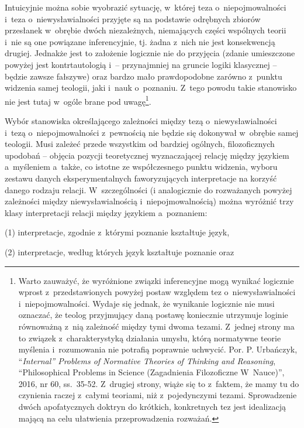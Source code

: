 \begin{enumerate}[label = \arabic*), listparindent=1.5em]
Intuicyjnie można sobie wyobrazić sytuację, w~której teza o~niepojmowalności i~teza o~niewysławialności przyjęte są na podstawie odrębnych zbiorów przesłanek w~obrębie dwóch niezależnych, niemających części wspólnych teorii i~nie są one powiązane inferencyjnie, tj. żadna z~nich nie jest konsekwencją drugiej. Jednakże jest to założenie logicznie nie do przyjęcia (zdanie umieszczone powyżej jest kontrtautologią i~-- przynajmniej na gruncie logiki klasycznej -- będzie zawsze fałszywe) oraz bardzo mało prawdopodobne zarówno z~punktu widzenia samej teologii, jaki i~nauk o~poznaniu. Z~tego powodu takie stanowisko nie jest tutaj w~ogóle brane pod uwagę\footnote{Warto zauważyć, że wyróżnione związki inferencyjne mogą wynikać logicznie wprost z~przedstawionych powyżej postaw względem tez o~niewysławialności i~niepojmowalności. Wydaje się jednak, że wynikanie logicznie nie musi oznaczać, że teolog przyjmujący daną postawę koniecznie utrzymuje loginie równoważną z~nią zależność między tymi dwoma tezami. Z~jednej strony ma to związek z~charakterystyką działania umysłu, którą normatywne teorie myślenia i~rozumowania nie potrafią poprawnie uchwycić. Por. P. Urbańczyk, ``\textit{Internal'' Problems of Normative Theories of Thinking and Reasoning}, ``Philosophical Problems in Science (Zagadnienia Filozoficzne W~Nauce)'', 2016, nr 60, ss.~35-52. Z~drugiej strony, wiąże się to z~faktem, że mamy tu do czynienia raczej z~całymi teoriami, niż z~pojedynczymi tezami. Sprowadzenie dwóch apofatycznych doktryn do krótkich, konkretnych tez jest idealizacją mającą na celu ułatwienia przeprowadzenia rozważań.}.
\end{enumerate}

Wybór stanowiska określającego zależności między tezą o~niewysławialności i~tezą o~niepojmowalności z~pewnością nie będzie się dokonywał w~obrębie samej teologii. Musi zależeć przede wszystkim od bardziej ogólnych, filozoficznych upodobań -- objęcia pozycji teoretycznej wyznaczającej relację między językiem a~myśleniem a~także, co istotne ze współczesnego punktu widzenia, wyboru zestawu danych eksperymentalnych faworyzujących interpretacje na korzyść danego rodzaju relacji. W~szczególności (i analogicznie do rozważanych powyżej zależności między niewysławialnością i~niepojmowalnością) można wyróżnić trzy klasy interpretacji relacji między językiem a~poznaniem:

(1) interpretacje, zgodnie z~którymi poznanie kształtuje język,

(2) interpretacje, według których język kształtuje poznanie oraz

